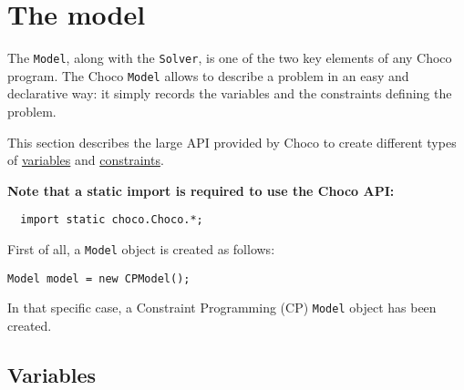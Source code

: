 \chapter{The model}\label{doc:model}\hypertarget{doc:model}{}

The {\tt Model}, along with the {\tt Solver}, is one of the two key elements of any Choco program. The Choco {\tt Model} allows to describe a problem in an easy and declarative way: it simply records the variables and the constraints defining the problem.

This section describes the large API provided by Choco to create different types of \hyperlink{model:variables}{variables} and \hyperlink{model:constraints}{constraints}.

\textbf{Note that a static import is required to use the Choco API:}
\begin{lstlisting}
  import static choco.Choco.*;
\end{lstlisting}

First of all, a {\tt Model} object is created as follows:
\begin{lstlisting}
Model model = new CPModel();
\end{lstlisting}
In that specific case, a Constraint Programming (CP) {\tt Model} object has been created. 




\section{Variables}\label{model:variables}\hypertarget{model:variables}{}


